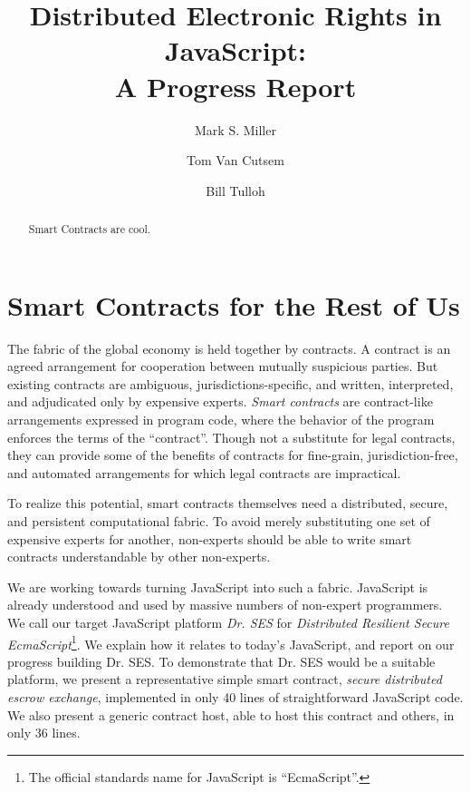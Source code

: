 \documentclass{llncs}
\begin{document}
\title{Distributed Electronic Rights in JavaScript:\\
A Progress Report}

\author{Mark S. Miller \and Tom Van Cutsem \and Bill Tulloh }


\maketitle    

\begin{abstract}

Smart Contracts are cool.

\end{abstract}

\section{Smart Contracts for the Rest of Us}

The fabric of the global economy is held together by contracts. A contract is an agreed arrangement for cooperation between mutually suspicious parties. But existing contracts are ambiguous, jurisdictions-specific, and written, interpreted, and adjudicated only by expensive experts. \emph{Smart contracts} are contract-like arrangements expressed in program code, where the behavior of the program enforces the terms of the ``contract''. Though not a substitute for legal contracts, they can provide some of the benefits of contracts for fine-grain, jurisdiction-free, and automated arrangements for which legal contracts are impractical.

To realize this potential, smart contracts themselves need a distributed, secure, and persistent computational fabric. To avoid merely substituting one set of expensive experts for another, non-experts should be able to write smart contracts understandable by other non-experts.

We are working towards turning JavaScript into such a fabric. JavaScript is already understood and used by massive numbers of non-expert programmers. We call our target JavaScript platform \emph{Dr. SES} for \emph{Distributed Resilient Secure EcmaScript}\footnote{The official standards name for JavaScript is ``EcmaScript''.}. We explain how it relates to today's JavaScript, and report on our progress building Dr. SES. To demonstrate that Dr. SES would be a suitable platform, we present a representative simple smart contract, \emph{secure distributed escrow exchange}, implemented in only 40 lines of straightforward JavaScript code. We also present a generic contract host, able to host this contract and others, in only 36 lines.
\end{document}
